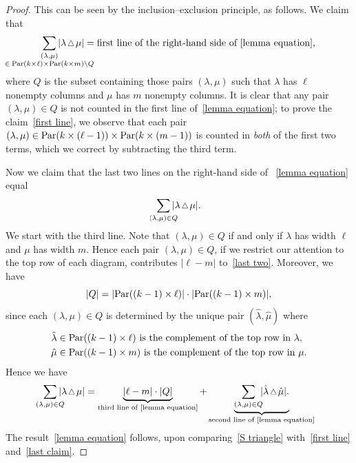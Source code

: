 \documentclass[11pt]{amsart}
\theoremstyle{plain}
\theoremstyle{definition}
\numberwithin{equation}{section}
\newcommand{\Par}{{\rm Par}}
\newcommand{\smtriangle}{\scalebox{.8}{$\,\triangle\,$}}
\begin{document}
\begin{proof}
    This can be seen by the inclusion--exclusion principle, as follows.
    We claim that
    \begin{equation}
    \label{first line}
        \sum_{\mathclap{\substack{(\lambda,\mu) \\ \in \: \Par(k \times \ell) \times \Par(k \times m) \setminus Q}}}|\lambda \smtriangle \mu| = \text{first line of the right-hand side of~\eqref{lemma equation},}    \end{equation}
    where $Q$ is the subset containing those pairs $(\lambda,\mu)$ such that $\lambda$ has $\ell$ nonempty columns and $\mu$ has $m$ nonempty columns.
    It is clear that any pair $(\lambda,\mu) \in Q$ is not counted in the first line of~\eqref{lemma equation}; to prove the claim~\eqref{first line}, we observe that each pair $(\lambda,\mu) \in \Par(k \times (\ell-1)) \times \Par(k \times (m-1))$ is counted in \emph{both} of the first two terms, which we correct by subtracting the third term.

    Now we claim that the last two lines on the right-hand side of ~\eqref{lemma equation} equal
    \begin{equation}
        \label{last two}
        \sum_{\mathclap{(\lambda,\mu) \in Q}}|\lambda \smtriangle \mu|.
    \end{equation}
    We start with the third line.
    Note that $(\lambda,\mu) \in Q$ if and only if $\lambda$ has width $\ell$ and $\mu$ has width $m$.
    Hence each pair $(\lambda, \mu) \in Q$, if we restrict our attention to the top row of each diagram, contributes $|\ell - m|$ to~\eqref{last two}.
    Moreover, we have
    \[
    |Q| = |\Par((k-1) \times \ell)|\cdot |\Par((k-1) \times m)|,
    \]
    since each $(\lambda, \mu) \in Q$ is determined by the unique pair $(\hat{\lambda}, \hat{\mu})$ where 
    \begin{align*}
        \hat{\lambda} &\in \Par((k-1) \times \ell) \text{ is the complement of the top row in $\lambda$,}\\
        \hat{\mu} &\in \Par((k-1) \times m) \text{ is the complement of the top row in $\mu$.}
    \end{align*}
    Hence we have
    \begin{equation}
        \label{last claim}
        \sum_{\mathclap{(\lambda,\mu) \in Q}}|\lambda \smtriangle \mu| = \underbrace{|\ell - m| \cdot |Q|}_{\text{third line of~\eqref{lemma equation}}} + \underbrace{\sum_{(\lambda, \mu) \in Q} \hspace{-1ex}|\hat{\lambda} \smtriangle \hat{\mu}|.}_{\text{second line of~\eqref{lemma equation}}}
    \end{equation}
    The result~\eqref{lemma equation} follows, upon comparing~\eqref{S triangle} with~\eqref{first line} and~\eqref{last claim}.
\end{proof}
\end{document}
